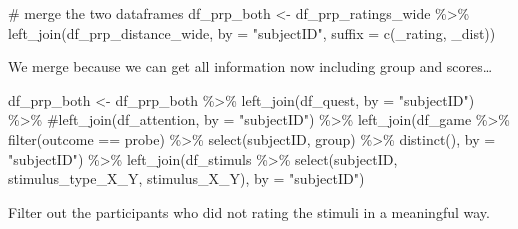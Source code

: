 \documentclass[
  letterpaper,
  DIV=11,
  numbers=noendperiod]{scrartcl}
\newenvironment{Shaded}{\begin{snugshade}}{\end{snugshade}}
\newcommand{\AttributeTok}[1]{\textcolor[rgb]{0.40,0.45,0.13}{#1}}
\newcommand{\CommentTok}[1]{\textcolor[rgb]{0.37,0.37,0.37}{#1}}
\newcommand{\FunctionTok}[1]{\textcolor[rgb]{0.28,0.35,0.67}{#1}}
\newcommand{\NormalTok}[1]{\textcolor[rgb]{0.00,0.23,0.31}{#1}}
\newcommand{\OtherTok}[1]{\textcolor[rgb]{0.00,0.23,0.31}{#1}}
\newcommand{\SpecialCharTok}[1]{\textcolor[rgb]{0.37,0.37,0.37}{#1}}
\newcommand{\StringTok}[1]{\textcolor[rgb]{0.13,0.47,0.30}{#1}}
\begin{document}
\begin{Shaded}
\begin{Highlighting}[]
\CommentTok{\# merge the two dataframes}
\NormalTok{df\_prp\_both }\OtherTok{\textless{}{-}}\NormalTok{ df\_prp\_ratings\_wide }\SpecialCharTok{\%\textgreater{}\%}
  \FunctionTok{left\_join}\NormalTok{(df\_prp\_distance\_wide, }\AttributeTok{by =} \StringTok{"subjectID"}\NormalTok{, }\AttributeTok{suffix =} \FunctionTok{c}\NormalTok{(}\StringTok{\textquotesingle{}\_rating\textquotesingle{}}\NormalTok{, }\StringTok{\textquotesingle{}\_dist\textquotesingle{}}\NormalTok{))}
\end{Highlighting}
\end{Shaded}

We merge because we can get all information now including group and
scores\ldots{}

\begin{Shaded}
\begin{Highlighting}[]
\NormalTok{df\_prp\_both }\OtherTok{\textless{}{-}}\NormalTok{ df\_prp\_both }\SpecialCharTok{\%\textgreater{}\%}
  \FunctionTok{left\_join}\NormalTok{(df\_quest, }\AttributeTok{by =} \StringTok{"subjectID"}\NormalTok{) }\SpecialCharTok{\%\textgreater{}\%}
  \CommentTok{\#left\_join(df\_attention, by = "subjectID") \%\textgreater{}\%}
  \FunctionTok{left\_join}\NormalTok{(df\_game }\SpecialCharTok{\%\textgreater{}\%} \FunctionTok{filter}\NormalTok{(outcome }\SpecialCharTok{==} \StringTok{\textquotesingle{}probe\textquotesingle{}}\NormalTok{) }\SpecialCharTok{\%\textgreater{}\%}
              \FunctionTok{select}\NormalTok{(subjectID, group) }\SpecialCharTok{\%\textgreater{}\%}
              \FunctionTok{distinct}\NormalTok{(), }\AttributeTok{by =} \StringTok{"subjectID"}\NormalTok{) }\SpecialCharTok{\%\textgreater{}\%}
  \FunctionTok{left\_join}\NormalTok{(df\_stimuls }\SpecialCharTok{\%\textgreater{}\%} 
              \FunctionTok{select}\NormalTok{(subjectID, stimulus\_type\_X\_Y, stimulus\_X\_Y), }\AttributeTok{by =} \StringTok{"subjectID"}\NormalTok{)}
\end{Highlighting}
\end{Shaded}

Filter out the participants who did not rating the stimuli in a
meaningful way.
\end{document}

